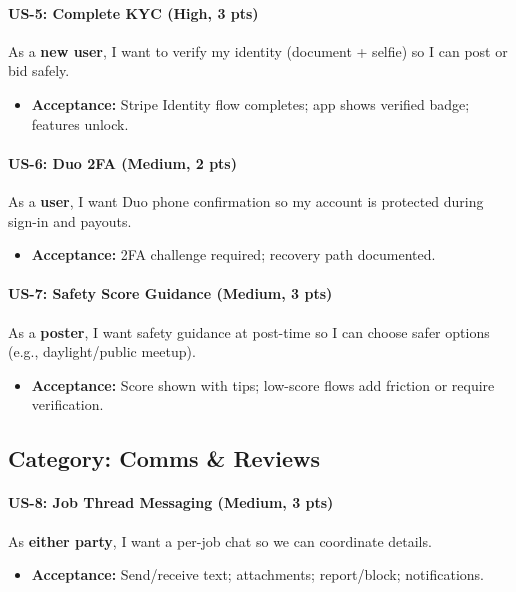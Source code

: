\documentclass[11pt]{article}
\begin{document}
\paragraph{US-5: Complete KYC (High, 3 pts)}
As a \textbf{new user}, I want to verify my identity (document + selfie) so I can post or bid safely.
\begin{itemize}[leftmargin=1.4em]
  \item \textbf{Acceptance:} Stripe Identity flow completes; app shows verified badge; features unlock.
\end{itemize}

\paragraph{US-6: Duo 2FA (Medium, 2 pts)}
As a \textbf{user}, I want Duo phone confirmation so my account is protected during sign-in and payouts.
\begin{itemize}[leftmargin=1.4em]
  \item \textbf{Acceptance:} 2FA challenge required; recovery path documented.
\end{itemize}

\paragraph{US-7: Safety Score Guidance (Medium, 3 pts)}
As a \textbf{poster}, I want safety guidance at post-time so I can choose safer options (e.g., daylight/public meetup).
\begin{itemize}[leftmargin=1.4em]
  \item \textbf{Acceptance:} Score shown with tips; low-score flows add friction or require verification.
\end{itemize}

\subsection*{Category: Comms \& Reviews}
\paragraph{US-8: Job Thread Messaging (Medium, 3 pts)}
As \textbf{either party}, I want a per-job chat so we can coordinate details.
\begin{itemize}[leftmargin=1.4em]
  \item \textbf{Acceptance:} Send/receive text; attachments; report/block; notifications.
\end{itemize}
\end{document}
